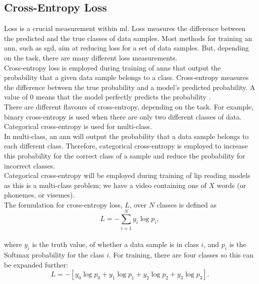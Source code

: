 \subsection{Cross-Entropy Loss}
\label{sec: Cross-Entropy Loss}
Loss is a crucial measurement within \acrshort{ml}. Loss measures the difference between the predicted and the true classes of data samples. Most methods for training an \acrshort{ann}, such as \acrfull{sgd}, aim at reducing loss for a set of data samples. But, depending on the task, there are many different loss measurements.\\
Cross-entropy loss is employed during training of \acrshort{ann}s that output the probability that a given data sample belongs to a class. Cross-entropy measures the difference between the true probability and a model's predicted probability. A value of 0 means that the model perfectly predicts the probability \cite{cross_entropy_loss}.\\
There are different flavours of cross-entropy, depending on the task. For example, binary cross-entropy is used when there are only two different classes of data. Categorical cross-entropy is used for \gls{multi-class}.\\
In \gls{multi-class}, an \acrshort{ann} will output the probability that a data sample belongs to each different class. Therefore, categorical cross-entropy is employed to increase this probability for the correct class of a sample and reduce the probability for incorrect classes.\\
Categorical cross-entropy will be employed during training of lip reading models as this is a \gls{multi-class} problem; we have a video containing one of $X$ words (or \gls{phoneme}s, or \gls{viseme}s).\\
The formulation for cross-entropy loss, $L$, over $N$ classes is defined as\\
\[L = - \sum_{i=1}^{N} y_i \log{p_i},\]\\
where $y_i$ is the truth value, of whether a data sample is in class $i$, and $p_i$ is the Softmax probability for the class $i$. For training, there are four classes so this can be expanded further:\\
\[L = - [ y_0 \log{p_0} + y_1 \log{p_1} + y_2 \log{p_2} + y_3 \log{p_3}].\]
